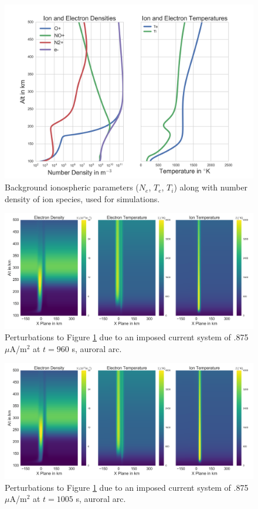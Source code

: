 \begin{figure}[!ht]
\centering
\includegraphics[width=6in]{backgroundallparams}
\caption{Background ionospheric parameters ($N_e$, $T_e$, $T_i$) along with number density of ion species, used for simulations.}
\label{fig:plparamst0inv}
\end{figure}

\begin{figure}[!ht]
\centering
\includegraphics[width=6in]{0960_15_int}
\caption{Perturbations to Figure \ref{fig:plparamst0inv} due to an imposed current system of .875 $\mu$A/m$^2$ at $t=960$ s, auroral arc.}
\label{fig:plparamst960inv}
\end{figure}


\begin{figure}[!ht]
\centering
\includegraphics[width=6in]{1005_15_int}
\caption{Perturbations to Figure \ref{fig:plparamst0inv} due to an imposed current system of .875 $\mu$A/m$^2$ at $t=1005$ s, auroral arc.}
\label{fig:plparamst1005inv}
\end{figure}

